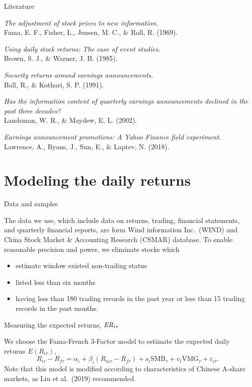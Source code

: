 \documentclass[
11pt,
ignorenonframetext,
]{beamer}
\begin{document}
\begin{frame}{Literature}
\protect\hypertarget{literature}{}

\emph{The adjustment of stock prices to new information.}\\
Fama, E. F., Fisher, L., Jensen, M. C., \& Roll, R. (1969).

\emph{Using daily stock returns: The case of event studies.}\\
Brown, S. J., \& Warner, J. B. (1985).

\emph{Security returns around earnings announcements.}\\
Ball, R., \& Kothari, S. P. (1991).

\emph{Has the information content of quarterly earnings announcements
declined in the past three decades?}\\
Landsman, W. R., \& Maydew, E. L. (2002).

\emph{Earnings announcement promotions: A Yahoo Finance field
experiment. } Lawrence, A., Ryans, J., Sun, E., \& Laptev, N. (2018).

\end{frame}

\hypertarget{modeling-the-daily-returns}{%
\section{Modeling the daily returns}\label{modeling-the-daily-returns}}

\begin{frame}{Data and samples}
\protect\hypertarget{data-and-samples}{}

The data we use, which include data on returns, trading, financial
statements, and quarterly financial reports, are form Wind information
Inc.~(WIND) and China Stock Market \& Accounting Research (CSMAR)
database. To enable reasonable precision and power, we eliminate stocks
which

\begin{itemize}
\item
  estimate window existed non-trading status
\item
  listed less than six months
\item
  having less than 180 trading records in the past year or less than 15
  trading records in the past months.
\end{itemize}

\end{frame}

\begin{frame}{Measuring the expected returns, \({\it ER}_{i\tau}\)}
\protect\hypertarget{measuring-the-expected-returns-it-er_itau}{}

We choose the Fama-French 3-Factor model to estimate the expected daily
returns \(E(R_{i\tau})\), \begin{equation}
R_{i\tau}-R_{f\tau} = \alpha_i + \beta_{i}(R_{m\tau} - R_{f\tau}) +
s_{i}\text{SMB}_\tau + v_{i}\text{VMG}_\tau +
\varepsilon_{i \tau}.
\end{equation} Note that this model is modified according to
characteristics of Chinese A-share markets, as Liu et al.~(2019)
recommended.

\end{frame}
\end{document}
